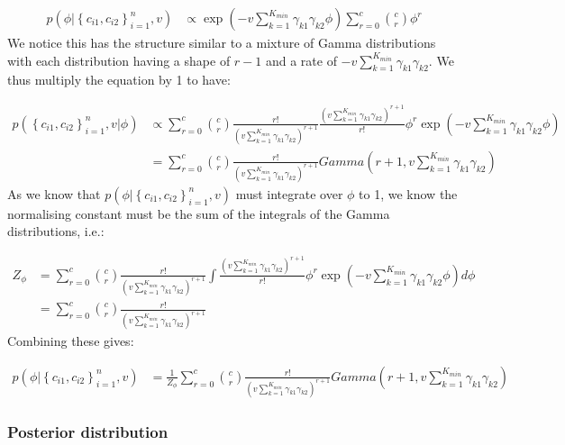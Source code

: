 \documentclass[11pt]{article} %
\begin{document}
\begin{align}
p(\phi | \left\{c_{i1}, c_{i2}\right\}_{i=1}^n, v) &\propto \exp\left(-v \sum_{k=1}^{K_{min}}\gamma_{k1} \gamma_{k2}\phi\right)  \sum_{r=0}^c \binom{c}{r} \phi^r
\end{align}
We notice this has the structure similar to a mixture of Gamma distributions with each distribution having a shape of $r-1$ and a rate of $-v\sum_{k=1}^{K_{min}}\gamma_{k1} \gamma_{k2}$. We thus multiply the equation by 1 to have:

\begin{align}
 p(\left\{c_{i1}, c_{i2}\right\}_{i=1}^n, v | \phi) &\propto  \sum_{r=0}^c \binom{c}{r} \frac{r!}{\left(v \sum_{k=1}^{K_{min}} \gamma_{k1} \gamma_{k2}\right)^{r+1}}  \frac{\left(v \sum_{k=1}^{K_{min}} \gamma_{k1} \gamma_{k2}\right)^{r+1}}{r!}\phi^r \exp\left(-v \sum_{k=1}^{K_{min}} \gamma_{k1} \gamma_{k2}\phi\right) \\
&= \sum_{r=0}^c  \binom{c}{r} \frac{r!}{\left(v \sum_{k=1}^{K_{min}} \gamma_{k1} \gamma_{k2}\right)^{r+1}} Gamma\left(r+1, v \sum_{k=1}^{K_{min}} \gamma_{k1} \gamma_{k2} \right)
\end{align}
As we know that $p(\phi | \left\{c_{i1}, c_{i2}\right\}_{i=1}^n, v)$ must integrate over $\phi$ to 1, we know the normalising constant must be the sum of the integrals of the Gamma distributions, i.e.:

\begin{align}
Z_{\phi} &= \sum_{r=0}^c   \binom{c}{r} \frac{r!}{\left(v \sum_{k=1}^{K_{min}} \gamma_{k1} \gamma_{k2}\right)^{r+1}}  \int\frac{\left(v \sum_{k=1}^{K_{min}} \gamma_{k1} \gamma_{k2}\right)^{r+1}}{r!}\phi^r \exp\left(-v \sum_{k=1}^{K_{min}} \gamma_{k1} \gamma_{k2}\phi\right) d\phi \\
&= \sum_{r=0}^c  \binom{c}{r} \frac{r!}{\left(v \sum_{k=1}^{K_{min}} \gamma_{k1} \gamma_{k2}\right)^{r+1}}  \label{Z_phi}
\end{align}
Combining these gives:

\begin{align}
p(\phi | \left\{c_{i1}, c_{i2}\right\}_{i=1}^n, v) &= \frac{1}{Z_{\phi}}  \sum_{r=0}^c  \binom{c}{r} \frac{r!}{\left(v \sum_{k=1}^{K_{min}} \gamma_{k1} \gamma_{k2}\right)^{r+1}} Gamma\left(r+1, v \sum_{k=1}^{K_{min}} \gamma_{k1} \gamma_{k2} \right)
\end{align}

\subsubsection{Posterior distribution}
\end{document}
